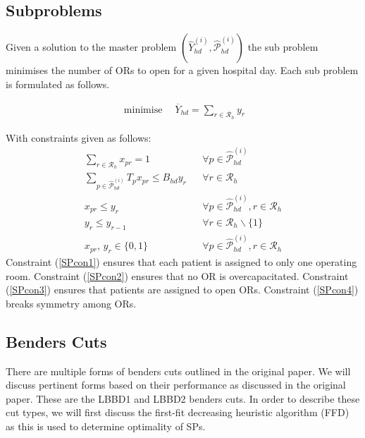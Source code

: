 \subsection{Subproblems}
Given a solution to the master problem $(\widehat{Y}^{(i)}_{hd}, \widehat{\mathcal{P}}^{(i)}_{hd})$ the 
sub problem minimises the number of ORs to open for a given hospital day. Each sub problem is
formulated as follows.

\begin{table}[H]
    \caption*{\bf{ADDITIONAL VARIABLES}}
\end{table}
\begin{align}
    \operatorname*{minimise} \quad \overline{Y}_{hd} = \sum\limits_{r \in \mathcal{R}_h}y_r
\end{align}

With constraints given as follows:
\begin{align}
    \sum\limits_{r\in\mathcal{R}_h}x_{pr} = 1 && \forall p \in \widehat{\mathcal{P}}^{(i)}_{hd}\label{SPcon1}\\
    \sum\limits_{p \in \widehat{\mathcal{P}}^{(i)}_{hd}} T_px_{pr} \leq B_{hd}y_r 
    && \forall r \in \mathcal{R}_h \label{SPcon2}\\
    x_{pr} \leq y_r && \forall p \in \widehat{\mathcal{P}}^{(i)}_{hd}, r \in \mathcal{R}_h \label{SPcon3}\\
    y_r \leq y_{r-1} && \forall r \in \mathcal{R}_h \backslash \{1\}\label{SPcon4}\\
    x_{pr},\,y_r\in\{0,1\} && \forall p \in \widehat{\mathcal{P}}^{(i)}_{hd}, r \in \mathcal{R}_h\label{SPcon5}
\end{align}
Constraint (\ref*{SPcon1}) ensures that each patient is assigned to only one operating room.
Constraint (\ref*{SPcon2}) ensures that no OR is overcapacitated. Constraint (\ref*{SPcon3})
ensures that patients are assigned to open ORs. Constraint (\ref*{SPcon4}) breaks symmetry
among ORs.

\subsection{Benders Cuts}
There are multiple forms of benders cuts outlined in the original paper. We will discuss
pertinent forms based on their performance as discussed in the original paper. These are 
the LBBD1 and LBBD2 benders cuts. In order to describe these cut types, we will first discuss the 
first-fit decreasing heuristic algorithm (FFD) as this is used to determine optimality of SPs. 


